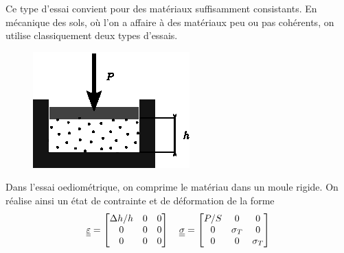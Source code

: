 Ce type d'essai convient pour des matériaux suffisamment consistants.
En mécanique des sols, où l'on a affaire à des matériaux peu ou pas cohérents, on utilise classiquement deux types d'essais.

\begin{figure}
    \begin{center}
        \includegraphics{../images/T1_Ch04-0009}
    \end{center}
\end{figure}
Dans l'essai oediométrique, on comprime le matériau dans un moule rigide.
On réalise ainsi un état de contrainte et de déformation de la forme
\begin{equation}
    \underline{\underline{\varepsilon}} =
    \begin{bmatrix}
        \Delta h/h & 0 & 0 \\
        0 & 0 & 0 \\
        0 & 0 & 0
    \end{bmatrix}
    \quad
    \underline{\underline{\sigma}} = 
    \begin{bmatrix}
        P/S & 0 & 0 \\
        0 & \sigma_T & 0 \\
        0 & 0 & \sigma_T
    \end{bmatrix}
    \label{eq:Ch04-037}
\end{equation}

